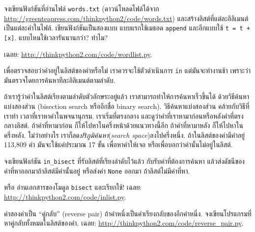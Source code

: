 \begin{exercise}

จงเขียนฟังก์ชันที่อ่านไฟล์ \texttt{words.txt} (ดาวน์โหลดไฟล์ได้จาก \url{http://greenteapress.com/thinkpython2/code/words.txt}) และสร้างลิสต์ที่แต่ละอิลิเมนต์เป็นแต่ละคำในไฟล์.
เขียนฟังก์ชันเป็นสองแบบ
แบบแรกใช้เมธอด \texttt{append}
และอีกแบบใช้ \texttt{t = t + [x]}.
แบบไหนใช้เวลารันนานกว่า? ทำไม?

เฉลย: \url{http://thinkpython2.com/code/wordlist.py}.

\end{exercise}
\vspace{0.5cm}


\begin{exercise}
\label{wordlist1}
\label{bisection}

เพื่อตรวจสอบว่าคำอยู่ในลิสต์ของคำหรือไม่
เราควรจะใช้ตัวดำเนินการ \texttt{in}
แต่มันจะทำงานช้า เพราะว่ามันตรวจโดยการค้นหาทีละอิลิเมนต์ตามลำดับ.

ถ้าเรารู้ว่าคำในลิสต์เรียงตามลำดับตัวอักษระอยู่แล้ว
เราสามารถทำให้การค้นหาเร็วขึ้นได้
ด้วยวิธีค้นหาแบ่งสองส่วน (bisection search หรืออีกชื่อ binary search).
วิธีค้นหาแบ่งสองส่วน คล้ายกับวิธีที่เราทำ เวลาที่เราหาคำในพจนานุกรม.
เราเริ่มที่ตรงกลาง และดูว่าคำที่เราหามาก่อนหรือหลังคำที่ตรงกลางลิสต์.
ถ้าคำที่หามาก่อน ก็ให้ไปหาในครึ่งหน้าด้วยแนวทางนี้อีก
ถ้าคำที่หามาหลัง ก็ให้ไปหาในครึ่งหลัง.
ไม่ว่าอย่างไร เราก็ลด\textit{ปริภูมิค้นหา}(\textit{search space})ลงไปครึ่งหนึ่ง.
ถ้าในลิสต์ของคำมีคำอยู่ 113,809 คำ มันจะใช้แค่ประมาณ 17 ขั้น เพื่อหาคำให้เจอ หรือเพื่อบอกว่าคำนั้นไม่อยู่ในลิสต์.

จงเขียนฟังก์ชัน \verb|in_bisect| ที่รับลิสต์ที่เรียงลำดับไว้แล้ว
กับรับค่าที่ต้องการค้นหา
แล้วส่งดัชนีของค่าที่หาออกมาถ้าลิสต์มีค่านั้นอยู่
หรือส่งค่า \texttt{None} ออกมา ถ้าลิสต์ไม่มีค่าที่หา.

หรือ อ่านเอกสารของโมดูล \texttt{bisect} และเรียกใช้!  
เฉลย: \url{http://thinkpython2.com/code/inlist.py}.

\end{exercise}
\vspace{0.5cm}


\begin{exercise}

คำสองคำเป็น ``คู่กลับ'' (reverse pair) ถ้าคำหนึ่งเป็นคำเรียงกลับของอีกคำหนึ่ง.
จงเขียนโปรแกรมที่หาคู่กลับทั้งหมดในลิสต์ของคำ.
เฉลย: \url{http://thinkpython2.com/code/reverse_pair.py}.

\end{exercise}
\vspace{0.5cm}


